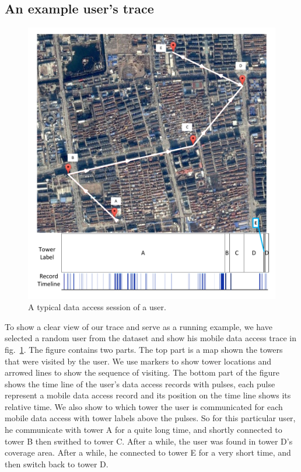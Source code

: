 \subsection{An example user's trace}

\begin{figure}[h]
    \centering
    \includegraphics[width=\linewidth]{./figures/typical_user.pdf}
    \caption{A typical data access session of a user.}
    \label{fig:typical_user}
\end{figure}

To show a clear view of our trace and serve as a running example, we have selected a random user from the dataset and show his mobile data access trace in fig.~\ref{fig:typical_user}. The figure contains two parts. The top part is a map shown the towers that were visited by the user. We use markers to show tower locations and arrowed lines to show the sequence of visiting. The bottom part of the figure shows the time line of the user's data access records with pulses, each pulse represent a mobile data access record and its position on the time line shows its relative time. We also show to which tower the user is communicated for each mobile data access with tower labels above the pulses. So for this particular user, he communicate with tower A for a quite long time, and shortly connected to tower B then swithed to tower C. After a while, the user was found in tower D's coverage area. After a while, he connected to tower E for a very short time, and then switch back to tower D.